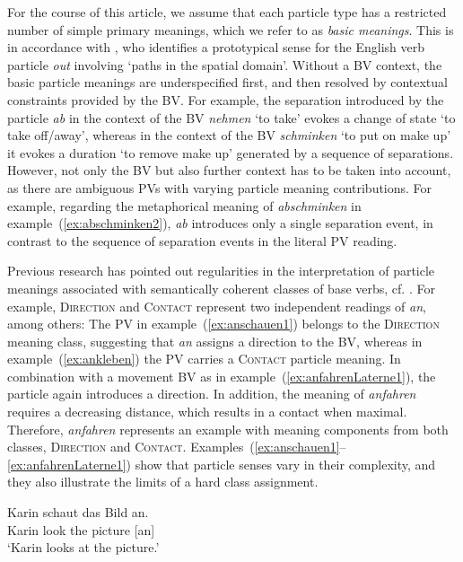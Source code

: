 \documentclass[output=paper]{langsci/langscibook}
\begin{document}
For the course of this article, we assume that each particle type has
a restricted number of simple primary meanings, which we refer to as
\textit{basic meanings}. This is in accordance with \cite{Lindner:83},
who identifies a prototypical sense for the English verb particle
\textit{out} involving `paths in the spatial domain'. Without a BV
context, the basic particle meanings are underspecified first, and
then resolved by contextual constraints provided by the BV. For
example, the separation introduced by the particle \textit{ab} in the
context of the BV \textit{nehmen} `to take' evokes a change of state
`to take off/away', whereas in the context of the BV
\textit{schminken} `to put on make up' it evokes a duration `to
remove make up' generated by a sequence of separations. However, not
only the BV but also further context has to be taken into account, as
there are ambiguous PVs with varying particle meaning
contributions. For example, regarding the metaphorical meaning of
\textit{abschminken} in example~(\ref{ex:abschminken2}), \textit{ab}
introduces only a single separation event, in contrast to the sequence
of separation events in the literal PV reading.

Previous research has pointed out regularities in the interpretation
of particle meanings associated with semantically coherent classes of
base verbs,
cf. \cite{Stiebels:96,Lechler/Rossdeutscher:09ALTER,Kliche:11ALTER,Springorum:11ALTER}.
For example, \textsc{Direction} and \textsc{Contact} represent two
independent readings of \textit{an}, among others: The PV in
example~(\ref{ex:anschauen1}) belongs to the \textsc{Direction}
meaning class, suggesting that \textit{an} assigns a direction to the
BV, whereas in example~(\ref{ex:ankleben}) the PV carries a
\textsc{Contact} particle meaning. In combination with a movement BV
as in example~(\ref{ex:anfahrenLaterne1}), the particle again
introduces a direction. In addition, the meaning of \textit{anfahren}
requires a decreasing distance, which results in a contact when
maximal. Therefore, \textit{anfahren} represents an example with
meaning components from both classes, \textsc{Direction} and
\textsc{Contact}. Examples~(\ref{ex:anschauen1}--\ref{ex:anfahrenLaterne1})
show that particle senses vary in their complexity, and they also
illustrate the limits of a hard class assignment.

\ea\label{ex:anschauen1}
\gll Karin schaut das Bild an.\\
Karin look the picture [an]\\
\glt `Karin looks at the picture.'
\z
\end{document}
